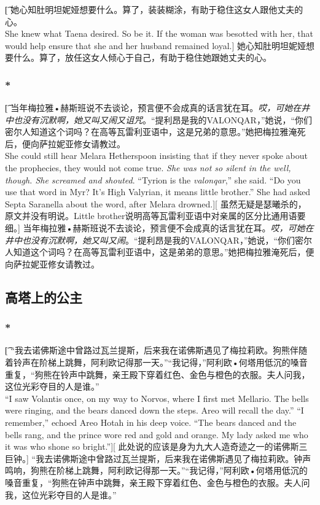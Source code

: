 \documentclass[12pt,a4paper]{article}
\begin{document}
\subsubsection{}\t[
	她心知肚明坦妮娅想要什么。算了，装装糊涂，有助于稳住这女人跟他丈夫的心。\\
	She knew what Taena desired. So be it. If the woman was besotted with her, that would help ensure that she and her husband remained loyal.]
	她心知肚明坦妮娅想要什么。算了，放任这女人倾心于自己，有助于稳住她跟她丈夫的心。
	
\subsubsection{\color{red}*}\t[
	当年梅拉雅•赫斯班说不去谈论，预言便不会成真的话言犹在耳。\emph{哎，可她在井中也没有沉默啊，她又叫又闹又诅咒}。“提利昂是我的VALONQAR，”她说，“你们密尔人知道这个词吗？在高等瓦雷利亚语中，这是兄弟的意思。”她把梅拉雅淹死后，便向萨拉妮亚修女请教过。\\
	She could still hear Melara Hetherspoon insisting that if they never spoke about the prophecies, they would not come true. \emph{She was not so silent in the well, though. She screamed and shouted}. “Tyrion is the \emph{valonqar},” she said. “Do you use that word in Myr? It's High Valyrian, it means little brother.” She had asked Septa Saranella about the word, after Melara drowned.][
	虽然无疑是瑟曦杀的，原文并没有明说。Little brother说明高等瓦雷利亚语中对亲属的区分比通用语要细。]
	当年梅拉雅•赫斯班说不去谈论，预言便不会成真的话言犹在耳。\emph{哎，可她在井中也没有沉默啊，她又叫又闹}。“提利昂是我的VALONQAR，”她说，“你们密尔人知道这个词吗？在高等瓦雷利亚语中，这是弟弟的意思。”她把梅拉雅淹死后，便向萨拉妮亚修女请教过。
	
\subsection{高塔上的公主}
\subsubsection{\color{red}*}\t[
	 “我去诺佛斯途中曾路过瓦兰提斯，后来我在诺佛斯遇见了梅拉莉欧。狗熊伴随着铃声在阶梯上跳舞，阿利欧记得那一天。”“我记得，”阿利欧•何塔用低沉的嗓音重复，“狗熊在铃声中跳舞，亲王殿下穿着红色、金色与橙色的衣服。夫人问我，这位光彩夺目的人是谁。”\\
	 “I saw Volantis once, on my way to Norvos, where I first met Mellario. The bells were ringing, and the bears danced down the steps. Areo will recall the day.”  “I remember,” echoed Areo Hotah in his deep voice. “The bears danced and the bells rang, and the prince wore red and gold and orange. My lady asked me who it was who shone so bright.”][
	 此处说的应该是身为九大人造奇迹之一的诺佛斯三巨钟。]
	 “我去诺佛斯途中曾路过瓦兰提斯，后来我在诺佛斯遇见了梅拉莉欧。钟声鸣响，狗熊在阶梯上跳舞，阿利欧记得那一天。”“我记得，”阿利欧•何塔用低沉的嗓音重复，“狗熊在钟声中跳舞，亲王殿下穿着红色、金色与橙色的衣服。夫人问我，这位光彩夺目的人是谁。”
	 
\end{document}
